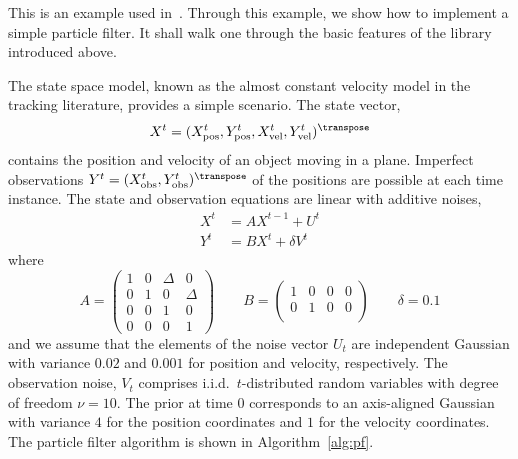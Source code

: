 This is an example used in~\cite{Johansen:2009wd}. Through this example, we
show how to implement a simple particle filter. It shall walk one through the
basic features of the library introduced above.

The state space model, known as the almost constant velocity model in the
tracking literature, provides a simple scenario. The state vector,
\begin{equation*}
  X^t = (\xpos^t, \ypos^t, \xvel^t, \yvel^t)^{\transpose}
\end{equation*}
contains the position and velocity of an object moving in a plane. Imperfect
observations $Y^t = (\xobs^t, \yobs^t)^{\transpose}$ of the positions are
possible at each time instance. The state and observation equations are linear
with additive noises,
\begin{align*}
  X^t &= AX^{t-1} + U^t \\
  Y^t &= BX^t + \delta V^t
\end{align*}
where
\begin{equation*}
  A = \begin{pmatrix}
    1 & 0 & \Delta & 0      \\
    0 & 1 & 0      & \Delta \\
    0 & 0 & 1      & 0      \\
    0 & 0 & 0      & 1
  \end{pmatrix} \qquad
  B = \begin{pmatrix}
    1 & 0 & 0 & 0 \\
    0 & 1 & 0 & 0 \\
  \end{pmatrix} \qquad
  \delta = 0.1
\end{equation*}
and we assume that the elements of the noise vector $U_t$ are independent
Gaussian with variance $0.02$ and $0.001$ for position and velocity,
respectively. The observation noise, $V_t$ comprises i.i.d.\ $t$-distributed
random variables with degree of freedom $\nu = 10$. The prior at time $0$
corresponds to an axis-aligned Gaussian with variance $4$ for the position
coordinates and $1$ for the velocity coordinates. The particle filter algorithm
is shown in Algorithm~\ref{alg:pf}.

